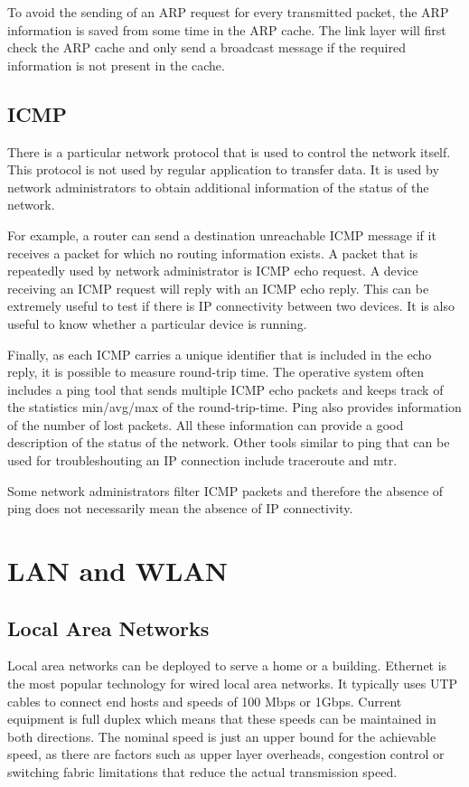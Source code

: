 To avoid the sending of an ARP request for every transmitted packet, the ARP information is saved from some time in the ARP cache.
The link layer will first check the ARP cache and only send a broadcast message if the required information is not present in the cache.


\subsection{ICMP}

There is a particular network protocol that is used to control the network itself.
This protocol is not used by regular application to transfer data. 
It is used by network administrators to obtain additional information of the status of the network.

For example, a router can send a destination unreachable ICMP message if it receives a packet for which no routing information exists.
A packet that is repeatedly used by network administrator is ICMP echo request.
A device receiving an ICMP request will reply with an ICMP echo reply.
This can be extremely useful to test if there is IP connectivity between two devices.
It is also useful to know whether a particular device is running.

Finally, as each ICMP carries a unique identifier that is included in the echo reply, it is possible to measure round-trip time.
The operative system often includes a ping tool that sends multiple ICMP echo packets and keeps track of the statistics min/avg/max of the round-trip-time.
Ping also provides information of the number of lost packets.
All these information can provide a good description of the status of the network.
Other tools similar to ping that can be used for troubleshouting an IP connection include traceroute and mtr.

Some network administrators filter ICMP packets and therefore the absence of ping does not necessarily mean the absence of IP connectivity.

\section{LAN and WLAN}

\subsection{Local Area Networks}

Local area networks can be deployed to serve a home or a building.
Ethernet is the most popular technology for wired local area networks.
It typically uses UTP cables to connect end hosts and speeds of 100 Mbps or 1Gbps.
Current equipment is full duplex which means that these speeds can be maintained in both directions.
The nominal speed is just an upper bound for the achievable speed, as there are factors such as upper layer overheads, congestion control or switching fabric limitations that reduce the actual transmission speed.

